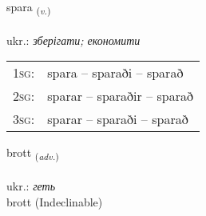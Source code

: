 \documentclass[frontgrid, backgrid]{flacards}\usepackage[]{graphicx}\usepackage[]{xcolor}
\begin{document}
\renewcommand{\flhead}{\vskip5pt \fboxsep=0pt {\small\bfseries\footnotesize Sagnorð | дієслово}}
\renewcommand{\fcfoot}{\vskip5pt \fboxsep=0pt \hspace{2pt}{\small\bfseries\footnotesize 3K}}

\renewcommand{\blhead}{\vskip5pt {\small\bfseries\footnotesize Sagnorð | дієслово }}
\renewcommand{\bcfoot}{\vskip5pt \hspace{2pt}{\small\bfseries\footnotesize 3K}}


{spara \small{\textsubscript{(\textit{v.})}} \\[1ex] %
\textphonetic{[spaːra]} \\
ukr.: \emph{зберігати; економити} \\  [2ex]
\renewcommand*{\arraystretch}{0.8}
\begin{tabular}{p{1cm}l}
\textsc{1sg}: & spara -- sparaði -- sparað \\ 
\textsc{2sg}: & sparar -- sparaðir -- sparað \\ 
\textsc{3sg}: & sparar -- sparaði -- sparað \\ 
\end{tabular}
}


\renewcommand{\flhead}{\vskip5pt \fboxsep=0pt {\small\bfseries\footnotesize Atviksorð | прислівник}}
\renewcommand{\fcfoot}{\vskip5pt \fboxsep=0pt \hspace{2pt}{\small\bfseries\footnotesize 3K}}

\renewcommand{\blhead}{\vskip5pt {\small\bfseries\footnotesize Atviksorð | прислівник }}
\renewcommand{\bcfoot}{\vskip5pt \hspace{2pt}{\small\bfseries\footnotesize 3K}}


{brott \small{\textsubscript{(\textit{adv.})}} \\[1ex]
\textphonetic{[prɔht]} \\
ukr.: \emph{геть} \\  [2ex]
brott (Indeclinable)}
\end{document}
